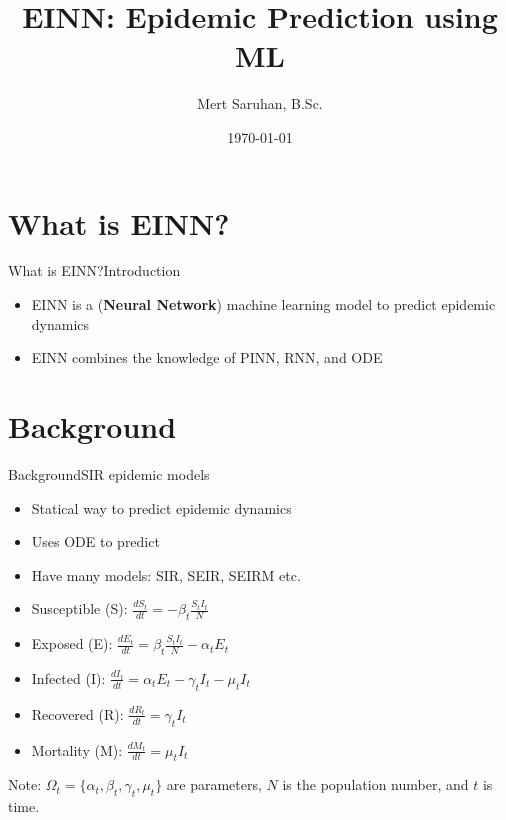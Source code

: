 \documentclass[
	aspectratio=169,	%
	onlytextwidth,		%
	t,					%
	]{beamer}
\title[EINN: Epidemic Prediction using ML]{EINN: Epidemic Prediction using ML}
\subtitle{}
\author[Mert Saruhan]{Mert Saruhan, B.Sc.}
\date{\today} %
\begin{document}
\section{What is EINN?}

\begin{frame}[fragile]{What is EINN?}{Introduction}

	\begin{itemize}
		\item<1-> EINN is a (\textbf{Neural Network}) machine learning model to predict epidemic dynamics~\cite{main}
		\item<2-> EINN combines the knowledge of PINN, RNN, and ODE~\cite{main}
	\end{itemize}

\end{frame}

\section{Background}

\begin{frame}[fragile]{Background}{SIR epidemic models}
	\begin{itemize}
		\item<1-> Statical way to predict epidemic dynamics
		\item<2-> Uses ODE to predict
		\item<3-> Have many models: SIR, SEIR, SEIRM etc.
		\item<4-> Susceptible (S): $\frac{dS_{t}}{dt} = - \beta_{t} \frac{S_{t}I_{t}}{N}$
		\item<5-> Exposed (E): $\frac{dE_{t}}{dt} = \beta_{t} \frac{S_{t}I_{t}}{N} - \alpha_{t}E_{t}$
		\item<6-> Infected (I): $\frac{dI_{t}}{dt} = \alpha_{t}E_{t} - \gamma_{t}I_{t} - \mu_{t}I_{t}$
		\item<7-> Recovered (R): $ \frac{dR_{t}}{dt} = \gamma_{t} I_{t}$
		\item<8-> Mortality (M): $\frac{dM_{t}}{dt} = \mu_{t}I_{t}$
	\end{itemize}
	\vfill
	Note: $\Omega_{t} =\{\alpha_{t}, \beta_{t}, \gamma_{t}, \mu_{t} \}$ are parameters, $N$ is the population number, and $t$ is time.

\end{frame}
\end{document}
